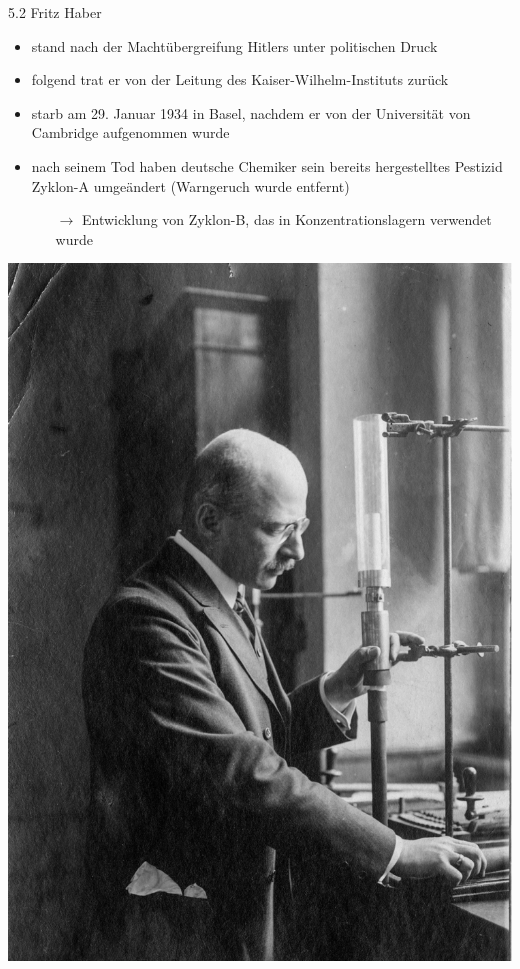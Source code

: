 \documentclass[
    aspectratio=1610
    ]{beamer}
\begin{document}
    \begin{frame}{5.2 Fritz Haber}
        \begin{minipage}{9.5cm}
            \begin{itemize}
                \item stand nach der Machtübergreifung Hitlers unter politischen Druck
                \item folgend trat er von der Leitung des Kaiser-Wilhelm-Instituts zurück
                \item starb am 29. Januar 1934 in Basel, nachdem er von der Universität von Cambridge aufgenommen wurde
                \item nach seinem Tod haben deutsche Chemiker sein bereits hergestelltes Pestizid Zyklon-A umgeändert (Warngeruch wurde entfernt)
                \begin{itemize}
                    \item[$\rightarrow$] Entwicklung von Zyklon-B, das in Konzentrationslagern verwendet wurde
                \end{itemize}
            \end{itemize}
        \end{minipage}
        \hspace{.25cm}
        \begin{minipage}{1cm}
            \includegraphics[scale=.25]{figures/Fritz_Haber_Ammoniakapp.png}
        \end{minipage}
    \end{frame}
\end{document}
